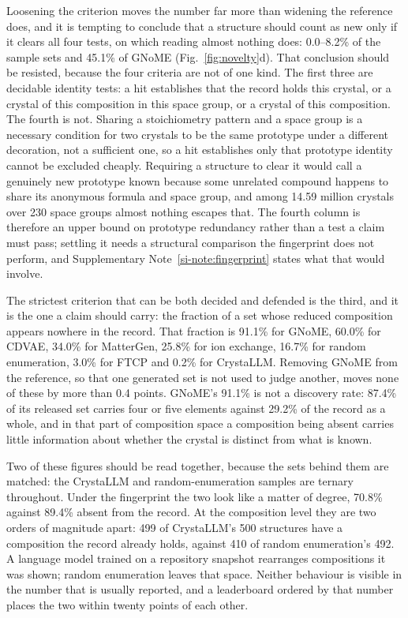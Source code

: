 Loosening the criterion moves the number far more than widening the reference
does, and it is tempting to conclude that a structure should count as new only if
it clears all four tests, on which reading almost nothing does: 0.0--8.2\% of the
sample sets and 45.1\% of GNoME (Fig.~\ref{fig:novelty}d). That conclusion should
be resisted, because the four criteria are not of one kind. The first three are
decidable identity tests: a hit establishes that the record holds this crystal,
or a crystal of this composition in this space group, or a crystal of this
composition. The fourth is not. Sharing a stoichiometry pattern and a space group
is a necessary condition for two crystals to be the same prototype under a
different decoration, not a sufficient one, so a hit establishes only that
prototype identity cannot be excluded cheaply. Requiring a structure to clear it
would call a genuinely new prototype known because some unrelated compound
happens to share its anonymous formula and space group, and among 14.59 million
crystals over 230 space groups almost nothing escapes that. The fourth column is
therefore an upper bound on prototype redundancy rather than a test a claim must
pass; settling it needs a structural comparison the fingerprint does not perform,
and Supplementary Note~\ref{si-note:fingerprint} states what that would involve.

The strictest criterion that can be both decided and defended is the third, and
it is the one a claim should carry: the fraction of a set whose reduced
composition appears nowhere in the record. That fraction is 91.1\% for GNoME,
60.0\% for CDVAE, 34.0\% for MatterGen, 25.8\% for ion exchange, 16.7\% for
random enumeration, 3.0\% for FTCP and 0.2\% for CrystaLLM. Removing GNoME from
the reference, so that one generated set is not used to judge another, moves none
of these by more than 0.4 points. GNoME's 91.1\% is not a discovery rate:
87.4\% of its released set carries four or five elements against 29.2\% of the
record as a whole, and in that part of composition space a composition being
absent carries little information about whether the crystal is distinct from what
is known.

Two of these figures should be read together, because the sets behind them are
matched: the CrystaLLM and random-enumeration samples are ternary throughout.
Under the fingerprint the two look like a matter of degree, 70.8\% against
89.4\% absent from the record. At the composition level they are two orders of
magnitude apart: 499 of CrystaLLM's 500 structures have a composition the record
already holds, against 410 of random enumeration's 492. A language model trained
on a repository snapshot rearranges compositions it was shown; random enumeration
leaves that space. Neither behaviour is visible in the number that is usually
reported, and a leaderboard ordered by that number places the two within twenty
points of each other.


